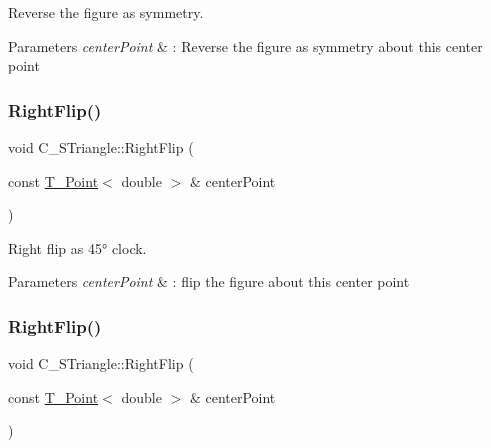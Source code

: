 Reverse the figure as symmetry. 


\begin{DoxyParams}{Parameters}
{\em center\+Point} & \+: Reverse the figure as symmetry about this center point \\
\hline
\end{DoxyParams}
\mbox{\label{classC__STriangle_ad84c7c6c2a4ca6d2fd3a681fd6dfcf63}} 
\subsubsection{\texorpdfstring{Right\+Flip()}{RightFlip()}\hspace{0.1cm}{\footnotesize\ttfamily [1/2]}}
{\footnotesize\ttfamily void C\+\_\+\+S\+Triangle\+::\+Right\+Flip (\begin{DoxyParamCaption}\item[{const \hyperlink{classT__Point}{T\+\_\+\+Point}$<$ double $>$ \&}]{center\+Point }\end{DoxyParamCaption})}



Right flip as 45° clock. 


\begin{DoxyParams}{Parameters}
{\em center\+Point} & \+: flip the figure about this center point \\
\hline
\end{DoxyParams}
\mbox{\label{classC__STriangle_ad84c7c6c2a4ca6d2fd3a681fd6dfcf63}} 
\subsubsection{\texorpdfstring{Right\+Flip()}{RightFlip()}\hspace{0.1cm}{\footnotesize\ttfamily [2/2]}}
{\footnotesize\ttfamily void C\+\_\+\+S\+Triangle\+::\+Right\+Flip (\begin{DoxyParamCaption}\item[{const \hyperlink{classT__Point}{T\+\_\+\+Point}$<$ double $>$ \&}]{center\+Point }\end{DoxyParamCaption})}



